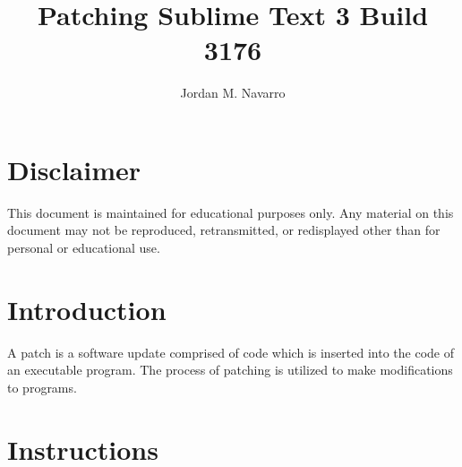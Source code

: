 \documentclass[12pt]{article}
\title{Patching Sublime Text 3 Build 3176}
\author{Jordan M. Navarro}
\date{}
\begin{document}
\maketitle

\section{Disclaimer}

This document is maintained for educational purposes only. Any material on this document may not be reproduced, retransmitted, or redisplayed other than for personal or educational use.

\section{Introduction}

A patch is a software update comprised of code which is inserted into the code of an executable program. The process of patching is utilized to make modifications to programs.

\section{Instructions}
\end{document}
